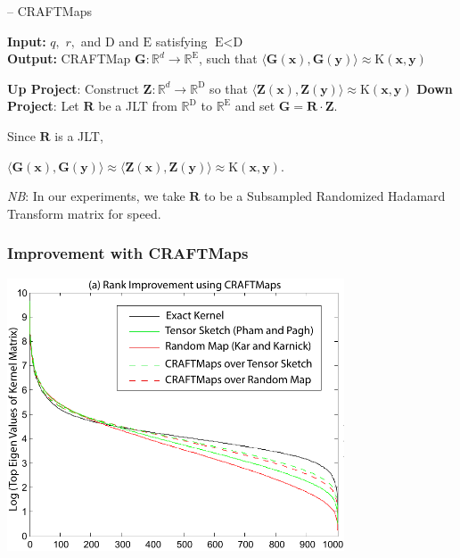 \documentclass[xcolor=x11names,compress,ignorenonframetext,10pt]{beamer}
\renewcommand{\(}{\begin{columns}}
\renewcommand{\)}{\end{columns}}
\newcommand{\<}[1]{\begin{column}{#1}}
\renewcommand{\>}{\end{column}}
\begin{document}

\begin{frame}
\begin{algorithm*}[H]
\caption{{\sc -- CRAFTMaps}}
\label{alg:craftmaps}
{\bf Input:} $q,$ $r,$ and $\textrm{D}$ and $\textrm{E}$ satisfying $\textrm{E} < \textrm{D}$\\
{\bf Output:} CRAFTMap $\textbf{G}: \mathbb{R}^d \rightarrow \mathbb{R}^{\textrm{E}}$, such that $\langle\textbf{G}(\mathbf{x}), \textbf{G}(\mathbf{y})\rangle \approx \textrm{K}(\mathbf{x},\mathbf{y})$\\
\begin{algorithmic}
    \State \textbf{Up Project}: Construct $\textbf{Z}: \mathbb{R}^d \rightarrow \mathbb{R}^{\textrm{D}}$ so that $\langle\textbf{Z}(\mathbf{x}), \textbf{Z}(\mathbf{y})\rangle \approx \textrm{K}(\mathbf{x},\mathbf{y})$
    \State \textbf{Down Project}: Let $\mathbf{R}$ be a JLT from $\mathbb{R}^{\textrm{D}}$ to $\mathbb{R}^{\textrm{E}}$ and set $\textbf{G} = \mathbf{R} \cdot \textbf{Z}.$
\end{algorithmic}
\end{algorithm*}

Since $\mathbf{R}$ is a JLT,
\begin{center}
    $\langle \textbf{G}(\mathbf{x}), \textbf{G}(\mathbf{y}) \rangle \approx 
     \langle \textbf{Z}(\mathbf{x}), \textbf{Z}(\mathbf{y}) \rangle \approx 
     \textrm{K}(\mathbf{x},\mathbf{y}).$
\end{center}

\emph{NB}: In our experiments, we take $\mathbf{R}$ to be a Subsampled Randomized Hadamard Transform matrix for speed.
\end{frame}

\begin{frame}
    \frametitle{Improvement with CRAFTMaps}
    \begin{center}
      \includegraphics[width=0.75\textwidth]{figures/craftmaps/rfm_limitations_01}
    \end{center}
\end{frame}
\end{document}
